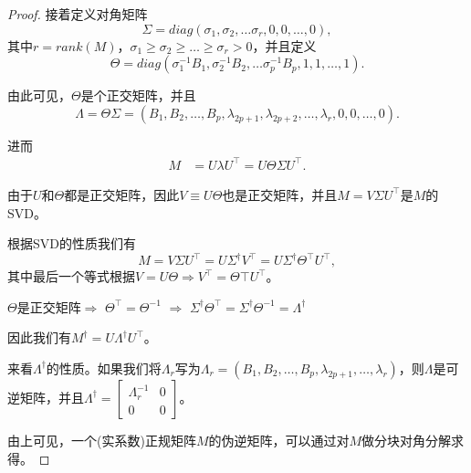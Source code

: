 \begin{subappendices}
\begin{proof}
  接着定义对角矩阵
  \begin{equation*}
    \Sigma = diag(\sigma_1, \sigma_2, \ldots \sigma_r, 0, 0, \ldots ,0),
  \end{equation*}
  其中$r = rank(M)$，$\sigma_1 \ge \sigma_2 \ge \ldots \ge \sigma_r >0$，并且定义
  \begin{equation*}
    \Theta = diag(\sigma_1^{-1} B_1, \sigma_2^{-1} B_2, \ldots \sigma_p^{-1} B_p, 1, 1, \ldots, 1).
  \end{equation*}

  由此可见，$\Theta$是个正交矩阵，并且
  \begin{equation*}
    \Lambda = \Theta \Sigma = (B_1, B_2, \ldots, B_p, \lambda_{2p+1}, \lambda_{2p+2}, \ldots, \lambda_r, 0, 0, \ldots, 0).
  \end{equation*}

  进而
  \begin{equation*}
    \begin{split}
      M &= U \lambda U^{\top} = U \Theta \Sigma U^{\top}.
    \end{split}
  \end{equation*}

  由于$U$和$\Theta$都是正交矩阵，因此$V \equiv U \Theta$也是正交矩阵，并且$M = V \Sigma U^{\top}$是$M$的SVD。

  根据SVD的性质我们有
  \begin{equation*}
    M = V \Sigma U^{\top} = U \Sigma^{\dagger} V^{\top} = U \Sigma^{\dagger} \Theta^{\top} U^{\top},
  \end{equation*}
  其中最后一个等式根据$V=U \Theta \Rightarrow V^{\top} = \Theta{\top} U^{\top}$。

  $\Theta$是正交矩阵$\Rightarrow$ $\Theta^{\top} = \Theta^{-1}$ $\Rightarrow$ $\Sigma^{\dagger} \Theta^{\top} = \Sigma^{\dagger} \Theta^{-1} = \Lambda^{\dagger}$

  因此我们有$M^{\dagger} = U \Lambda ^{\dagger} U^{\top}$。

  来看$\Lambda^{\dagger}$的性质。如果我们将$\Lambda_r$写为$\Lambda_r = \left( B_1, B_2, \ldots, B_p, \lambda_{2p+1}, \ldots, \lambda_r \right)$，则$\Lambda$是可逆矩阵，并且$\Lambda^{\dagger} = \begin{bmatrix} \Lambda_r^{-1} & 0 \\ 0 & 0 \end{bmatrix}$。

  由上可见，一个(实系数)正规矩阵$M$的伪逆矩阵，可以通过对$M$做分块对角分解求得。
\end{proof}


\end{subappendices}
